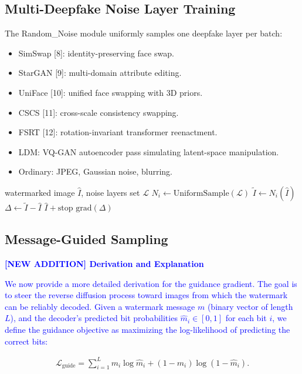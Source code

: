 \documentclass{article}
\begin{document}
\subsection{Multi-Deepfake Noise Layer Training}
The Random\_Noise module uniformly samples one deepfake layer per batch:
\begin{itemize}
\item SimSwap [8]: identity-preserving face swap.
\item StarGAN [9]: multi-domain attribute editing.
\item UniFace [10]: unified face swapping with 3D priors.
\item CSCS [11]: cross-scale consistency swapping.
\item FSRT [12]: rotation-invariant transformer reenactment.
\item LDM: VQ-GAN autoencoder pass simulating latent-space manipulation.
\item Ordinary: JPEG, Gaussian noise, blurring.
\end{itemize}

\begin{algorithm}[h]
\caption{Random Noise Layer Forward Pass}
\begin{algorithmic}[1]
\REQUIRE watermarked image $\hat{I}$, noise layers set $\mathcal{L}$
\STATE $N_i \leftarrow \text{UniformSample}(\mathcal{L})$
\STATE $\tilde{I} \leftarrow N_i(\hat{I})$
\STATE $\Delta \leftarrow \tilde{I} - \hat{I}$
\RETURN $\hat{I} + \text{stop grad}(\Delta)$
\end{algorithmic}
\end{algorithm}

\subsection{Message-Guided Sampling}
\textcolor{blue}{\textbf{[NEW ADDITION] Derivation and Explanation}}

\textcolor{blue}{
We now provide a more detailed derivation for the guidance gradient. The goal is to steer the reverse diffusion process toward images from which the watermark can be reliably decoded. Given a watermark message $m$ (binary vector of length $L$), and the decoder's predicted bit probabilities $\hat{m}_i \in [0,1]$ for each bit $i$, we define the guidance objective as maximizing the log-likelihood of predicting the correct bits:
}

\begin{align}
\mathcal{L}_{\text{guide}} = \sum_{i=1}^L m_i \log \hat{m}_i + (1-m_i) \log (1-\hat{m}_i).
\end{align}
\end{document}
